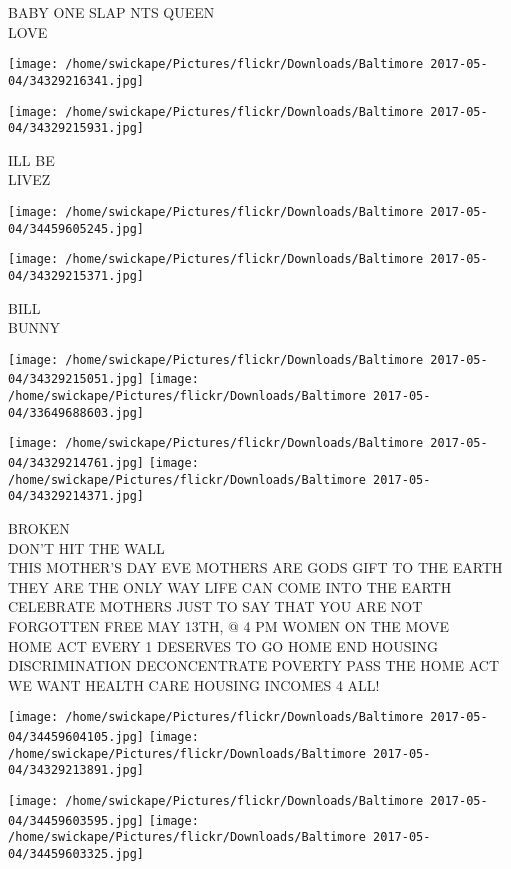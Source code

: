 \documentclass[10pt,letterpaper]{article}
\begin{document}
BABY ONE SLAP NTS QUEEN\\
LOVE\\
\pagebreak

\texttt{[image: /home/swickape/Pictures/flickr/Downloads/Baltimore 2017-05-04/34329216341.jpg]}

\vspace{0.25in}
\texttt{[image: /home/swickape/Pictures/flickr/Downloads/Baltimore 2017-05-04/34329215931.jpg]}

ILL BE\\
LIVEZ\\
\pagebreak

\texttt{[image: /home/swickape/Pictures/flickr/Downloads/Baltimore 2017-05-04/34459605245.jpg]}

\vspace{0.25in}
\texttt{[image: /home/swickape/Pictures/flickr/Downloads/Baltimore 2017-05-04/34329215371.jpg]}

BILL\\
BUNNY\\
\pagebreak

\texttt{[image: /home/swickape/Pictures/flickr/Downloads/Baltimore 2017-05-04/34329215051.jpg]}
\texttt{[image: /home/swickape/Pictures/flickr/Downloads/Baltimore 2017-05-04/33649688603.jpg]}

\texttt{[image: /home/swickape/Pictures/flickr/Downloads/Baltimore 2017-05-04/34329214761.jpg]}
\texttt{[image: /home/swickape/Pictures/flickr/Downloads/Baltimore 2017-05-04/34329214371.jpg]}

BROKEN\\
DON'T HIT THE WALL\\
THIS MOTHER'S DAY EVE MOTHERS ARE GODS GIFT TO THE EARTH THEY ARE THE ONLY WAY LIFE CAN COME INTO THE EARTH CELEBRATE MOTHERS JUST TO SAY THAT YOU ARE NOT FORGOTTEN FREE MAY 13TH, @ 4 PM WOMEN ON THE MOVE\\
HOME ACT EVERY 1 DESERVES TO GO HOME END HOUSING DISCRIMINATION DECONCENTRATE POVERTY PASS THE HOME ACT WE WANT HEALTH CARE HOUSING INCOMES 4 ALL!\\
\pagebreak

\texttt{[image: /home/swickape/Pictures/flickr/Downloads/Baltimore 2017-05-04/34459604105.jpg]}
\texttt{[image: /home/swickape/Pictures/flickr/Downloads/Baltimore 2017-05-04/34329213891.jpg]}

\texttt{[image: /home/swickape/Pictures/flickr/Downloads/Baltimore 2017-05-04/34459603595.jpg]}
\texttt{[image: /home/swickape/Pictures/flickr/Downloads/Baltimore 2017-05-04/34459603325.jpg]}
\end{document}
